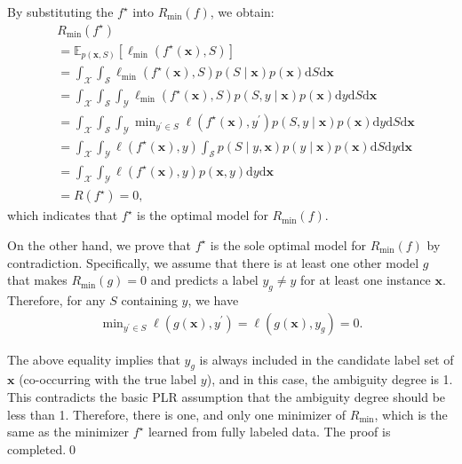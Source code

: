 \documentclass[letterpaper]{article} %
\begin{document}
By substituting the $f^\star$ into $R_{\mathrm{min}}(f)$, we obtain:
\begin{align}
\nonumber
&R_{\mathrm{min}}(f^\star) \\
\nonumber
&=\mathbb{E}_{p(\bm{x}, S)}[\ell_{\mathrm{min}}(f^\star(\bm{x}),S)]\\
\nonumber
&=\int_{\mathcal{X}}\int_{\mathcal{S}}\ell_{\mathrm{min}}(f^\star(\bm{x}),S)p(S\mid\bm{x})p(\bm{x})\mathrm{d}S \mathrm{d}\bm{x}\\
\nonumber
&=\int_{\mathcal{X}}\int_{\mathcal{S}}\int_{\mathcal{Y}}\ell_{\mathrm{min}}(f^\star(\bm{x}),S)p(S,y\mid\bm{x})p(\bm{x})\mathrm{d}y \mathrm{d}S \mathrm{d}\bm{x}\\
\nonumber
&=\int_{\mathcal{X}}\int_{\mathcal{S}}\int_{\mathcal{Y}}\min\nolimits_{y^\prime\in S}\ell(f^\star(\bm{x}), y^\prime)p(S,y\mid\bm{x})p(\bm{x})\mathrm{d}y \mathrm{d}S \mathrm{d}\bm{x}\\
\nonumber
&=\int_{\mathcal{X}}\int_{\mathcal{Y}}\ell(f^\star(\bm{x}), y)\int_{\mathcal{S}}p(S\mid y,\bm{x})p(y\mid\bm{x})p(\bm{x})\mathrm{d}S \mathrm{d}y \mathrm{d}\bm{x}\\
\nonumber
&=\int_{\mathcal{X}}\int_{\mathcal{Y}}\ell(f^\star(\bm{x}), y)p(\bm{x},y)\mathrm{d}y \mathrm{d}\bm{x}\\
\nonumber
&=R(f^\star)=0,
\end{align}
which indicates that $f^\star$ is the optimal model for $R_{\mathrm{min}}(f)$. 

On the other hand, we prove that $f^\star$ is the sole optimal model for $R_{\mathrm{min}}(f)$ by contradiction. Specifically, we assume that there is at least one other model $g$ that makes $R_{\mathrm{min}}(g)=0$ and predicts a label $y_{g} \neq y$ for at least one instance $\bm{x}$. Therefore, for any $S$ containing $y$, we have
\begin{gather}
\nonumber
\min\nolimits_{y^\prime\in S}\ell(g(\bm{x}), y^\prime)=\ell(g(\bm{x}), y_{g})=0.
\end{gather}

The above equality implies that $y_{g}$ is always included in the candidate label set of $\bm{x}$ (co-occurring with the true label $y$), and in this case, the ambiguity degree is 1. This contradicts the basic PLR assumption that the ambiguity degree should be less than 1. Therefore, there is one, and only one minimizer of $R_{\mathrm{min}}$, which is the same as the minimizer $f^\star$ learned from fully labeled data. The proof is completed.\qed
\end{document}
